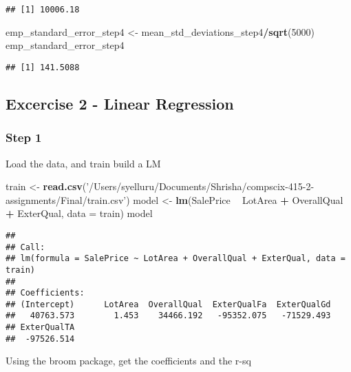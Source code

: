 \documentclass[]{article}
\newenvironment{Shaded}{\begin{snugshade}}{\end{snugshade}}
\newcommand{\KeywordTok}[1]{\textcolor[rgb]{0.13,0.29,0.53}{\textbf{#1}}}
\newcommand{\DataTypeTok}[1]{\textcolor[rgb]{0.13,0.29,0.53}{#1}}
\newcommand{\DecValTok}[1]{\textcolor[rgb]{0.00,0.00,0.81}{#1}}
\newcommand{\StringTok}[1]{\textcolor[rgb]{0.31,0.60,0.02}{#1}}
\newcommand{\OperatorTok}[1]{\textcolor[rgb]{0.81,0.36,0.00}{\textbf{#1}}}
\newcommand{\NormalTok}[1]{#1}
\begin{document}
\begin{verbatim}
## [1] 10006.18
\end{verbatim}

\begin{Shaded}
\begin{Highlighting}[]
\NormalTok{emp_standard_error_step4 <-}\StringTok{ }\NormalTok{mean_std_deviations_step4}\OperatorTok{/}\KeywordTok{sqrt}\NormalTok{(}\DecValTok{5000}\NormalTok{)}
\NormalTok{emp_standard_error_step4}
\end{Highlighting}
\end{Shaded}

\begin{verbatim}
## [1] 141.5088
\end{verbatim}

\subsection{Excercise 2 - Linear
Regression}\label{excercise-2---linear-regression}

\subsubsection{Step 1}\label{step-1-1}

Load the data, and train build a LM

\begin{Shaded}
\begin{Highlighting}[]
\NormalTok{train <-}\StringTok{ }\KeywordTok{read.csv}\NormalTok{(}\StringTok{'/Users/syelluru/Documents/Shrisha/compscix-415-2-assignments/Final/train.csv'}\NormalTok{)}
\NormalTok{model <-}\StringTok{ }\KeywordTok{lm}\NormalTok{(SalePrice }\OperatorTok{~}\StringTok{ }\NormalTok{LotArea }\OperatorTok{+}\StringTok{ }\NormalTok{OverallQual }\OperatorTok{+}\StringTok{ }\NormalTok{ExterQual, }\DataTypeTok{data =}\NormalTok{ train)}
\NormalTok{model}
\end{Highlighting}
\end{Shaded}

\begin{verbatim}
## 
## Call:
## lm(formula = SalePrice ~ LotArea + OverallQual + ExterQual, data = train)
## 
## Coefficients:
## (Intercept)      LotArea  OverallQual  ExterQualFa  ExterQualGd  
##   40763.573        1.453    34466.192   -95352.075   -71529.493  
## ExterQualTA  
##  -97526.514
\end{verbatim}

Using the broom package, get the coefficients and the r-sq
\end{document}
